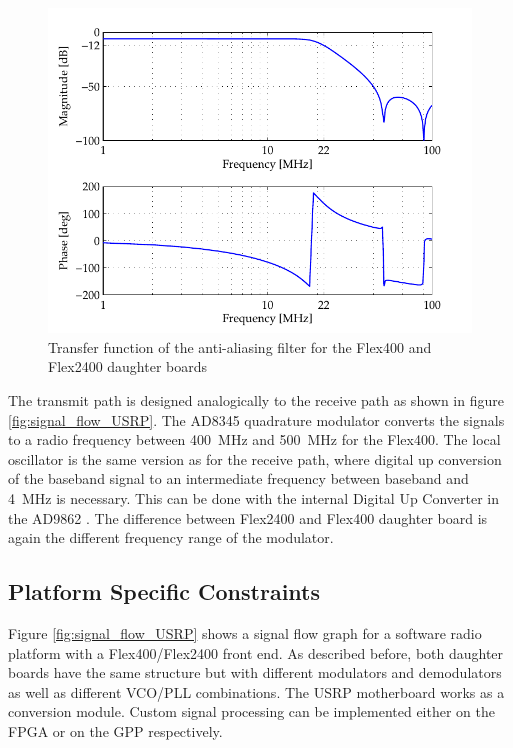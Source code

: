 \begin{figure}
\centering
\includegraphics[width = 1.0\textwidth]{../kapitel03/figures/transfer_function_flex400.pdf}
\caption{Transfer function of the anti-aliasing filter for the Flex400 and Flex2400 daughter boards}
\label{fig:transfer_function_flex400}
\end{figure}

The transmit path is designed analogically to the receive path as shown in figure \ref{fig:signal_flow_USRP}. The AD8345 quadrature modulator \cite{ad8345} converts the signals to a radio frequency between \SI{400}{MHz} and \SI{500}{MHz} for the Flex400. The local oscillator is the same version as for the receive path, where digital up conversion of the baseband signal to an intermediate frequency between baseband and \SI{4}{MHz} is necessary. This can be done with the internal Digital Up Converter in the AD9862 \cite{ad9862}. The difference between Flex2400 and Flex400 daughter board is again the different frequency range of the modulator.


\subsection{Platform Specific Constraints}

Figure \ref{fig:signal_flow_USRP} shows a signal flow graph for a software radio platform with a Flex400/Flex2400 front end. As described before, both daughter boards have the same structure but with different modulators and demodulators as well as different VCO/PLL combinations. The USRP motherboard works as a conversion module. Custom signal processing can be implemented either on the FPGA or on the GPP respectively.

